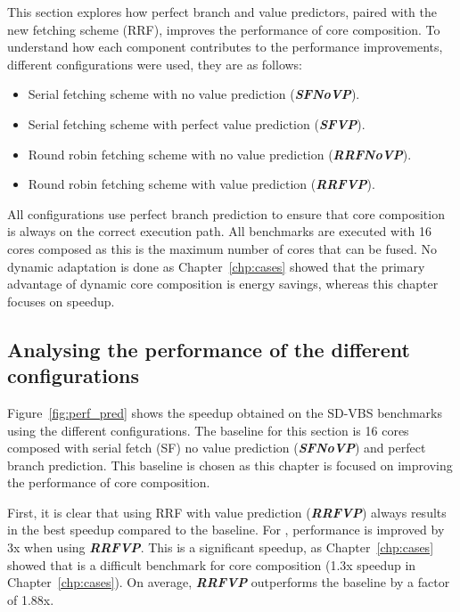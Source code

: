 \newcommand{\novp}{\textit{\textbf{SFNoVP}}}
\newcommand{\vp}{\textit{\textbf{SFVP}}}
\newcommand{\nfnovp}{\textit{\textbf{RRFNoVP}}}
\newcommand{\nfvp}{\textit{\textbf{RRFVP}}}

\newcommand{\optvp}{\textit{\textbf{OptVP}}}
\newcommand{\vt}{\textit{\textbf{VT}}}
\newcommand{\nfvt}{\textit{\textbf{RFVT}}}
\vspace{-1em}

This section explores how perfect branch and value predictors, paired with the new fetching scheme (RRF), improves the performance of core composition.
To understand how each component contributes to the performance improvements, different configurations were used, they are as follows:
\begin{itemize}
\item Serial fetching scheme with no value prediction (\novp).
\vspace{-1em}
\item Serial fetching scheme with perfect value prediction (\vp).
\vspace{-1em}
\item Round robin fetching scheme with no value prediction (\nfnovp).
\vspace{-1em}
\item Round robin fetching scheme with value prediction (\nfvp).
\end{itemize}

All configurations use perfect branch prediction  to ensure that core composition is always on the correct execution path.
All benchmarks are executed with 16 cores composed as this is the maximum number of cores that can be fused.
No dynamic adaptation is done as Chapter~\ref{chp:cases} showed that the primary advantage of dynamic core composition is energy savings, whereas this chapter focuses on speedup.


\subsection{Analysing the performance of the different configurations}
Figure~\ref{fig:perf_pred} shows the speedup obtained on the SD-VBS benchmarks using the different configurations.
The baseline for this section is 16 cores composed with serial fetch (SF) no value prediction (\novp) and perfect branch prediction.
This baseline is chosen as this chapter is focused on improving the performance of core composition.

First, it is clear that using RRF with value prediction (\nfvp) always results in the best speedup compared to the baseline.
For , performance is improved by 3x when using \nfvp.
This is a significant speedup, as Chapter~\ref{chp:cases} showed that  is a difficult benchmark for core composition (1.3x speedup in Chapter~\ref{chp:cases}).
On average, \nfvp{} outperforms the baseline by a factor of 1.88x.

